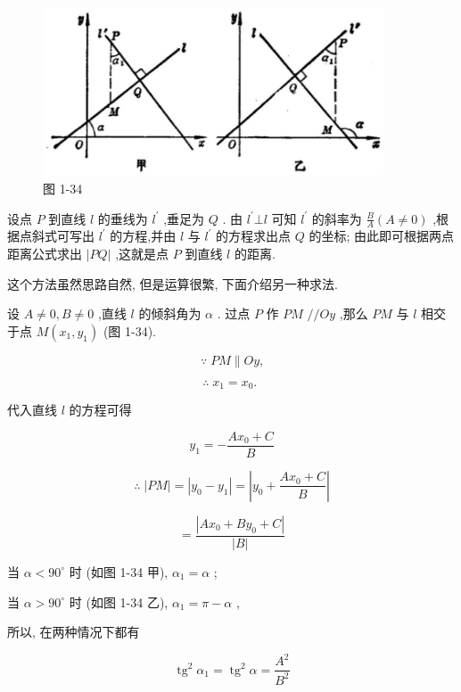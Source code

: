 \documentclass[lang=cn,newtx,10pt,scheme=chinese]{elegantbook}
\begin{document}
\begin{figure}[h]
  \centering
  \includegraphics[max width=0.9\textwidth]{images/01912cc2-ffb6-728e-9ae7-b113ff05c64b_54_863018.jpg}
  \caption{图 1-34}
\end{figure}



设点 \(P\) 到直线 \(l\) 的垂线为 \({l}^{\prime }\) ,垂足为 \(Q\) . 由 \({l}^{\prime } \bot l\) 可知 \({l}^{\prime }\) 的斜率为 \(\frac{B}{A}\left( {A \neq 0}\right)\) ,根据点斜式可写出 \({l}^{\prime }\) 的方程,并由 \(l\) 与 \({l}^{\prime }\) 的方程求出点 \(Q\) 的坐标; 由此即可根据两点距离公式求出 \(\left| {PQ}\right|\) ,这就是点 \(P\) 到直线 \(l\) 的距离.

这个方法虽然思路自然, 但是运算很繁, 下面介绍另一种求法.

设 \(A \neq 0,B \neq 0\) ,直线 \(l\) 的倾斜角为 \(\alpha\) . 过点 \(P\) 作 \({PM}\) \(//{Oy}\) ,那么 \({PM}\) 与 \(l\) 相交于点 \(M\left( {{x}_{1},{y}_{1}}\right)\) (图 1-34).

\[
  \because \;{PM}\parallel {Oy}\text{,}
\]

\[
  \therefore \;{x}_{1} = {x}_{0}\text{. }
\]

代入直线 \(l\) 的方程可得

\[
    {y}_{1} = - \frac{A{x}_{0} + C}{B}
\]

\[
  \therefore \;\left| {PM}\right| = \left| {{y}_{0} - {y}_{1}}\right| = \left| {{y}_{0} + \frac{A{x}_{0} + C}{B}}\right|
\]

\[
  = \frac{\left| A{x}_{0} + B{y}_{0} + C\right| }{\left| B\right| }
\]

当 \(\alpha < {90}^{ \circ }\) 时 (如图 1-34 甲), \({\alpha }_{1} = \alpha\) ;

当 \(\alpha > {90}^{ \circ }\) 时 (如图 1-34 乙), \({\alpha }_{1} = \pi - \alpha\) ,

所以, 在两种情况下都有

\[
    {\operatorname{tg}}^{2}{\alpha }_{1} = {\operatorname{tg}}^{2}\alpha = \frac{{A}^{2}}{{B}^{2}}
\]
\end{document}
